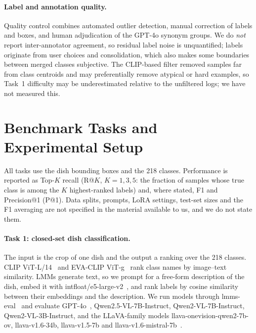 \documentclass[sigconf, nonacm]{acmart}
\begin{document}


\paragraph{Label and annotation quality.}
Quality control combines automated outlier detection, manual correction of labels and boxes, and human adjudication of the GPT-4o synonym groups. We do \emph{not} report inter-annotator agreement, so residual label noise is unquantified; labels originate from user choices and consolidation, which also makes some boundaries between merged classes subjective. The CLIP-based filter removed samples far from class centroids and may preferentially remove atypical or hard examples, so Task~1 difficulty may be underestimated relative to the unfiltered logs; we have not measured this.

\section{Benchmark Tasks and Experimental Setup}
All tasks use the dish bounding boxes and the 218 classes. Performance is reported as Top-$K$ recall (R@$K$, $K=1,3,5$: the fraction of samples whose true class is among the $K$ highest-ranked labels) and, where stated, F1 and Precision@1 (P@1). Data splits, prompts, LoRA settings, test-set sizes and the F1 averaging are not specified in the material available to us, and we do not state them.

\paragraph{Task 1: closed-set dish classification.}
The input is the crop of one dish and the output a ranking over the 218 classes. CLIP ViT-L/14~\cite{CLIP} and EVA-CLIP ViT-g~\cite{sun2023eva} rank class names by image--text similarity. LMMs generate text, so we prompt for a free-form description of the dish, embed it with intfloat/e5-large-v2~\cite{wang2023e5}, and rank labels by cosine similarity between their embeddings and the description. We run models through lmms-eval~\cite{lmms_eval2024} and evaluate GPT-4o~\cite{achiam2023gpt}, Qwen2.5-VL-7B-Instruct, Qwen2-VL-7B-Instruct, Qwen2-VL-3B-Instruct, and the LLaVA-family models llava-onevision-qwen2-7b-ov, llava-v1.6-34b, llava-v1.5-7b and llava-v1.6-mistral-7b~\cite{liu2024improved,liu2024visual}.
\end{document}
